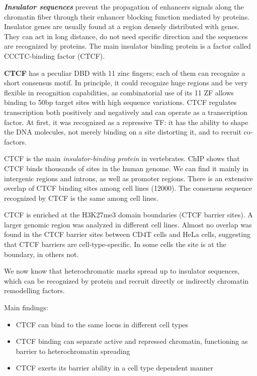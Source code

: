 \textbf{\emph{Insulator sequences}} prevent the propagation of enhancers signals along the chromatin fiber through their enhancer blocking function mediated by proteins. Insulator genes are usually found at a region densely distributed with genes. They can act in long distance, do not need specific direction and the sequences are recognized by proteins. The main insulator binding protein is a factor called CCCTC-binding factor (CTCF).

\textbf{CTCF} has a peculiar DBD with 11 zinc fingers; each of them can recognize a short consensus motif. In principle, it could recognize huge regions and be very flexible in recognition capabilities, as combinatorial use of its 11 ZF allows binding to 50bp target sites with high sequence variations. CTCF regulates transcription both positively and negatively and can operate as a transcription factor. At first, it was recognized as a repressive TF: it has the ability to shape the DNA molecules, not merely binding on a site distorting it, and to recruit co-factors.

CTCF is the main \emph{insulator-binding protein} in vertebrates. ChIP shows that CTCF binds thousands of sites in the human genome. We can find it mainly in intergenic regions and introns, as well as promoter regions. There is an extensive overlap of CTCF binding sites among cell lines (12000). The consensus sequence recognized by CTCF is the same among cell lines.

CTCF is enriched at the H3K27me3 domain boundaries (CTCF barrier sites). A larger genomic region was analyzed in different cell lines. Almost no overlap was found in the CTCF barrier sites between CD4T cells and HeLa cells, suggesting that CTCF barriers are cell-type-specific. In some cells the site is at the boundary, in others not.

We now know that heterochromatic marks spread up to insulator sequences, which can be recognized by protein and recruit directly or indirectly chromatin remodelling factors.

Main findings:

\begin{itemize}
\tightlist
\item
  CTCF can bind to the same locus in different cell types
\item
  CTCF binding can separate active and repressed chromatin, functioning as barrier to heterochromatin spreading
\item
  CTCF exerts its barrier ability in a cell type dependent manner
\end{itemize}

